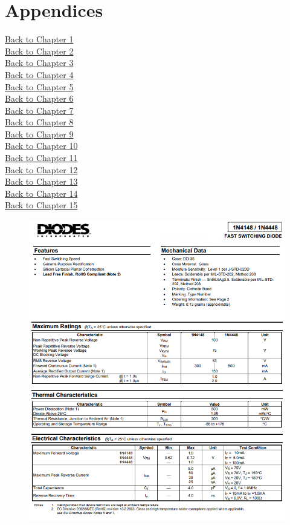 \chapter*{Appendices}

\hyperlink{chapter.1}{Back to Chapter 1}\\
\hyperlink{chapter.2}{Back to Chapter 2}\\
\hyperlink{chapter.3}{Back to Chapter 3}\\
\hyperlink{chapter.4}{Back to Chapter 4}\\
\hyperlink{chapter.5}{Back to Chapter 5}\\
\hyperlink{chapter.6}{Back to Chapter 6}\\
\hyperlink{chapter.7}{Back to Chapter 7}\\
\hyperlink{chapter.8}{Back to Chapter 8}\\
\hyperlink{chapter.9}{Back to Chapter 9}\\
\hyperlink{chapter.10}{Back to Chapter 10}\\
\hyperlink{chapter.11}{Back to Chapter 11}\\
\hyperlink{chapter.12}{Back to Chapter 12}\\
\hyperlink{chapter.13}{Back to Chapter 13}\\
\hyperlink{chapter.14}{Back to Chapter 14}\\
\hyperlink{chapter.15}{Back to Chapter 15}\\

\FloatBarrier
\begin{figure}[h]
    \centering
    \includegraphics[width=0.9\linewidth]{Appendices/1N4148.png}
    \label{1N4148}
\end{figure}
\FloatBarrier


